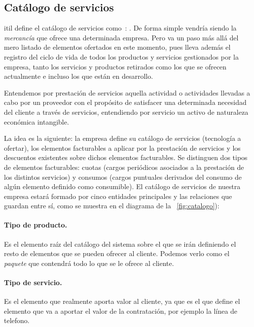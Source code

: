 \subsection{Catálogo de servicios}
\label{sub:catalogo}

\acrshort{itil} define el catálogo de servicios como~\cite{catalogoITIL}:
. De forma simple vendría siendo la \textit{mercancía} que ofrece una determinada empresa. Pero va un paso más allá del mero listado de elementos ofertados en este momento, pues lleva además el registro del ciclo de vida de todos los productos y servicios gestionados por la empresa, tanto los servicios y productos retirados como los que se ofrecen actualmente e incluso los que están en desarrollo.

Entendemos por prestación de servicios aquella actividad o actividades llevadas a cabo por un proveedor con el propósito de satisfacer una determinada necesidad del cliente a través de servicios, entendiendo por servicio un activo de naturaleza económica intangible.

La idea es la siguiente: la empresa define su catálogo de servicios (tecnología a ofertar), los elementos facturables a aplicar por la prestación de servicios y los descuentos existentes sobre dichos elementos facturables. Se distinguen dos tipos de elementos facturables: cuotas (cargos periódicos asociados a la prestación de los distintos servicios) y consumos (cargos puntuales derivados del consumo de algún elemento definido como consumible).
El catálogo de servicios de nuestra empresa estará formado por cinco entidades principales y las relaciones que guardan entre sí, como se muestra en el diagrama de la \figurename~\ref{fig:catalogo}):

\paragraph{Tipo de producto.} Es el elemento raíz del catálogo del sistema sobre el que se irán definiendo el resto de elementos que se pueden ofrecer al cliente. Podemos verlo como el \textit{paquete} que contendrá todo lo que se le ofrece al cliente.
\paragraph{Tipo de servicio.} Es el elemento que realmente aporta valor al cliente, ya que es el que define el elemento que va a aportar el valor de la contratación, por ejemplo la línea de telefono.
